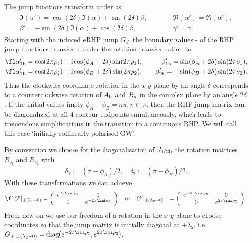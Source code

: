\documentclass[12pt]{iopart}
\begin{document}
The jump functions transform under  as
\begin{eqnarray}\begin{array}{ll}
\Im (\alpha')=\cos(2\delta)\Im (\alpha)+\sin(2\delta)\beta, \quad\quad\quad&
\Re (\alpha')=\Re (\alpha'), \\
\beta'=-\sin(2\delta)\Im (\alpha)+\cos(2\delta)\beta, &
\gamma'=\gamma.
\end{array}\end{eqnarray}
Starting with the induced eRHP jump $G_J$, the boundary values - of the RHP jump functions transform under the rotation transformation  to
\begin{eqnarray}
\fl\alpha'_{1{\rm b}} &= \cos (2\pi \rho_1)-{\rm i} \cos(\phi_A+2\delta) \sin (2 \pi  \rho_1), \quad
&\beta'_{1{\rm b}} =  \sin(\phi_A+2\delta) \sin (2 \pi \rho_1),  \\
\fl\alpha'_{2{\rm b}} &= \cos (2\pi \rho_2)+{\rm i} \cos(\phi_B+2\delta) \sin (2 \pi  \rho_2), \quad
&\beta'_{2{\rm b}} = - \sin(\phi_B+2\delta) \sin (2 \pi \rho_2).
\end{eqnarray}
Thus the clockwise coordinate rotation in the $x$-$y$-plane by an angle $\delta$ corresponds to a counterclockwise rotation of $A_{\rm b}$ and $B_{\rm b}$ in the complex plane by an angle $2\delta$.
If the initial values imply $\phi_A-\phi_B=n \pi, n\in \mathbb{R}$, then the RHP jump matrix can be diagonalized at all 4 contour endpoints simultaneously, which leads to tremendous simplifications in the transition to a continuous RHP. We will call this case `initially collinearly polarised GW'.

By convention we choose for the diagonalisation of $J_{1/2{\rm b}}$ the rotation matrices $R_{\delta_1}$ and $R_{\delta_2}$ with
\begin{eqnarray}
\delta_1:=(\pi-\phi_A)/2,\quad \delta_2:=(\pi-\phi_B)/2.
\end{eqnarray}
With these transformations we can achieve 
\begin{eqnarray}
\fl G'|_{\pm(\lambda_1+0)}&=\left(\begin{array}{cc} e^{2\pi \rmi \rho_1} & 0 \\  0 & e^{-2\pi \rmi \rho_1} \end{array}\right) \quad {\rm or}\quad
G'|_{\pm(\lambda_2-0)}&=\left(\begin{array}{cc} e^{-2\pi \rmi \rho_2} & 0 \\  0 & e^{2\pi \rmi \rho_2} \end{array}\right). \label{gstrichRand}
\end{eqnarray}
From now on we use our freedom of a rotation in the $x$-$y$-plane to choose coordinates so that the jump matrix is initially diagonal at $\pm\lambda_2$, i.e. $G_J|_{\pm(\lambda_2-0)}={\rm diag}(e^{-2\pi \rmi \rho_2} , e^{2\pi \rmi \rho_2})$.
\end{document}
